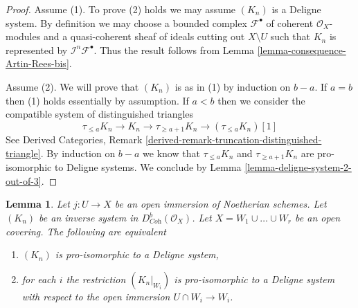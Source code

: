 \documentclass{stacks-project}
\theoremstyle{plain}
\newtheorem{lemma}[subsection]{Lemma}
\theoremstyle{definition}
\theoremstyle{remark}
\numberwithin{equation}{subsection}
\begin{document}
\begin{proof}
Assume (1). To prove (2) holds we may assume $(K_n)$ is a Deligne system.
By definition we may choose a bounded complex $\mathcal{F}^\bullet$
of coherent $\mathcal{O}_X$-modules and a quasi-coherent
sheaf of ideals cutting out $X \setminus U$ such that
$K_n$ is represented by $\mathcal{I}^n\mathcal{F}^\bullet$.
Thus the result follows from Lemma \ref{lemma-consequence-Artin-Rees-bis}.

\medskip\noindent
Assume (2). We will prove that $(K_n)$ is as in (1) by induction on
$b - a$. If $a = b$ then (1) holds essentially by assumption.
If $a < b$ then we consider the compatible system of
distinguished triangles
$$
\tau_{\leq a}K_n \to K_n \to \tau_{\geq a + 1}K_n \to (\tau_{\leq a}K_n)[1]
$$
See Derived Categories, Remark
\ref{derived-remark-truncation-distinguished-triangle}.
By induction on $b - a$ we know that $\tau_{\leq a}K_n$ and
$\tau_{\geq a + 1}K_n$ are pro-isomorphic to Deligne systems.
We conclude by Lemma \ref{lemma-deligne-system-2-out-of-3}.
\end{proof}

\begin{lemma}
\label{lemma-characterize-extension-by-zero}
Let $j : U \to X$ be an open immersion of Noetherian schemes. Let
$(K_n)$ be an inverse system in $D^b_{\textit{Coh}}(\mathcal{O}_X)$.
Let $X = W_1 \cup \ldots \cup W_r$ be an open covering.
The following are equivalent
\begin{enumerate}
\item $(K_n)$ is pro-isomorphic to a Deligne system,
\item for each $i$ the restriction $(K_n|_{W_i})$
is pro-isomorphic to a Deligne system with respect to
the open immersion $U \cap W_i \to W_i$.
\end{enumerate}
\end{lemma}
\end{document}
